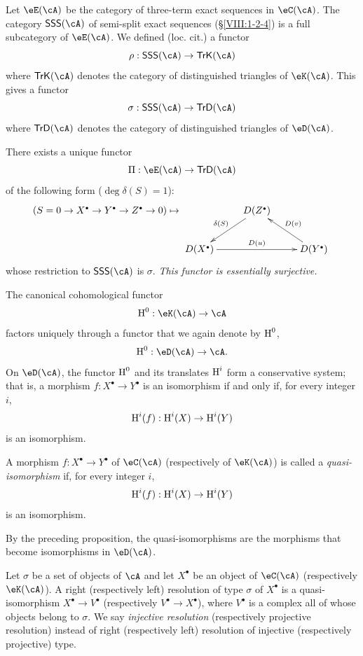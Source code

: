 Let $\eE(\cA)$ be the category of three-term exact sequences in
$\eC(\cA)$. The category $\mathsf{SSS}(\cA)$ of semi-split exact
sequences (\S\ref{VIII:1-2-4}) is a full subcategory of $\eE(\cA)$.
We defined (loc. cit.) a functor
\[
  \rho:\mathsf{SSS}(\cA) \to \mathsf{TrK}(\cA)
\]
where $\mathsf{TrK}(\cA)$ denotes the category of distinguished triangles
of $\eK(\cA)$. This gives a functor
\[
  \sigma : \mathsf{SSS}(\cA) \to \mathsf{TrD}(\cA)
\]
where $\mathsf{TrD}(\cA)$ denotes the category of distinguished triangles
of $\eD(\cA)$.

\begin{proposition}\label{VIII:3-1-5}
There exists a unique functor
\[
  \Pi:\eE(\cA) \to \mathsf{TrD}(\cA)
\]
of the following form ($\deg \delta(S)=1$):
\[
(S=0 \to X^\bullet \to Y^\bullet \to Z^\bullet \to 0)
\mapsto
\xymatrix{
  & D(Z^\bullet) \ar[dl]_-{\delta(S)} \\
  D(X^\bullet) \ar[rr]^-{D(u)}
    & & D(Y^\bullet) \ar[ul]_-{D(v)}
}
\]
whose restriction to $\mathsf{SSS}(\cA)$ is $\sigma$. \emph{This functor
is essentially surjective.}
\end{proposition}

\begin{proposition}\label{VIII:3-1-6}
The canonical cohomological functor
\[
  \h^0:\eK(\cA) \to \cA
\]
factors uniquely through a functor that we again denote by $\operatorname{H}^0$,
\[
  \h^0:\eD(\cA) \to \cA \text{.}
\]
On $\eD(\cA)$, the functor $\operatorname{H}^0$ and its translates $\operatorname{H}^i$ form a
conservative system; that is, a morphism $f:X^\bullet \to Y^\bullet$ is
an isomorphism if and only if, for every integer $i$,
\[
  \operatorname{H}^i(f):\operatorname{H}^i(X) \to \operatorname{H}^i(Y)
\]
is an isomorphism.
\end{proposition}

\begin{definition}\label{VIII:3-1-7}
A morphism $f:X^\bullet \to Y^\bullet$ of $\eC(\cA)$ (respectively of
$\eK(\cA)$) is called a \emph{quasi-isomorphism} if, for every integer
$i$,
\[
  \operatorname{H}^i(f):\operatorname{H}^i(X) \to \operatorname{H}^i(Y)
\]
is an isomorphism.
\end{definition}

By the preceding proposition, the quasi-isomorphisms are the morphisms
that become isomorphisms in $\eD(\cA)$.

\begin{definition}\label{VIII:3-1-8}
Let $\sigma$ be a set of objects of $\cA$ and let $X^\bullet$ be an
object of $\eC(\cA)$ (respectively $\eK(\cA)$). A right (respectively
left) resolution of type $\sigma$ of $X^\bullet$ is a quasi-isomorphism
$X^\bullet \to V^\bullet$ (respectively $V^\bullet \to X^\bullet$), where
$V^\bullet$ is a complex all of whose objects belong to $\sigma$. We say
\emph{injective resolution} (respectively projective resolution) instead
of right (respectively left) resolution of injective (respectively
projective) type.
\end{definition}

